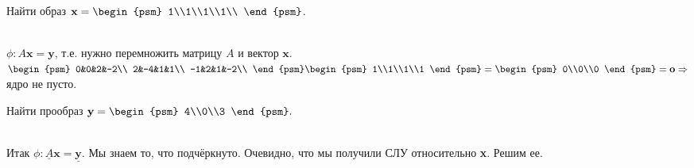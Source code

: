 \begin{prim}
Найти образ $\textbf{x}=\begin{psm}
	1\\1\\1\\1\\
\end{psm}$.
\end{prim}\\
$\phi: A\textbf{x}=\textbf{y}$, т.е. нужно перемножить матрицу $A$ и вектор $\textbf{x}$.\\
$
\begin{psm}
0&0&2&-2\\
2&-4&1&1\\
-1&2&1&-2\\
\end{psm}
\begin{psm}
1\\1\\1\\1
\end{psm}
=
\begin{psm}
0\\0\\0
\end{psm}
=\textbf{o}
\Rightarrow$ ядро не пусто.
\begin{prim}
Найти прообраз $\textbf{y}=\begin{psm}
	4\\0\\3
\end{psm}.$
\end{prim}\\
Итак $\phi: \underline{A}\textbf{x}=\underline{\textbf{y}}$. Мы знаем то, что подчёркнуто. Очевидно, что мы получили СЛУ относительно \textbf{x}. Решим ее.